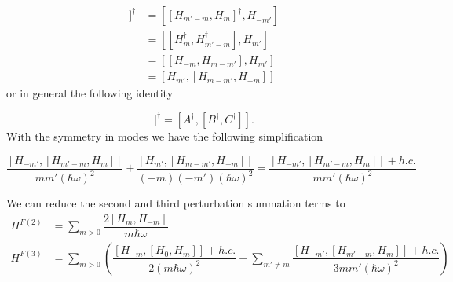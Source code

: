 \documentclass[aps,prb,showpacs,amsmath,amssymb,superscriptaddress]{revtex4-2}
\begin{document}
\begin{align}
  [H_{-m'},[H_{m'-m},H_m]]^{\dagger} &= [[H_{m'-m},H_m]^{\dagger}, H_{-m'}^{\dagger}] \nonumber \\
  &= [ [H_m^{\dagger}, H_{m'-m}^{\dagger}], H_{m'}] \nonumber \\
  &= [ [H_{-m}, H_{m-m'}], H_{m'}] \nonumber \\
  &= [H_{m'}, [H_{m-m'}, H_{-m}]]
\end{align}
or in general the following identity

\begin{equation}
  [A,[B,C]]^{\dagger} = [A^{\dagger}, [B^{\dagger}, C^{\dagger}]].
\end{equation}
With the symmetry in modes we have the following simplification

\begin{equation}
  \dfrac{[H_{-m'},[H_{m'-m},H_m]]}{mm'(\hbar\omega)^2} + \dfrac{[H_{m'},[H_{m-m'},H_{-m}]]}{(-m)(-m')(\hbar\omega)^2} = \dfrac{[H_{-m'},[H_{m'-m},H_m]] + h.c.}{mm'(\hbar\omega)^2}
\end{equation}

We can reduce the second and third perturbation summation terms to
\begin{align}
  H^{F(2)} &= \sum_{m> 0} \dfrac{2[H_m, H_{-m}]}{m\hbar\omega} \\
  H^{F(3)} &= \sum_{m> 0} \left( \dfrac{[H_{-m} , [H_0, H_m]] + h.c.}{2(m\hbar\omega)^2} + \sum_{m'\neq m} \dfrac{[H_{-m'}, [H_{m'-m}, H_m]] + h.c.}{3mm'(\hbar\omega)^2} \right)
\end{align}








\end{document}
